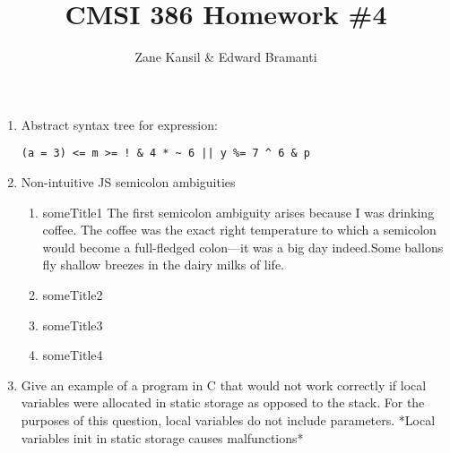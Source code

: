 \documentclass{article}
\title{CMSI 386 Homework \#4}
\author{Zane Kansil \& Edward Bramanti}
\begin{document}
\maketitle
\begin{enumerate}
\item Abstract syntax tree for expression: 
\begin{center}
\begin{verbatim}
(a = 3) <= m >= ! & 4 * ~ 6 || y %= 7 ^ 6 & p
\end{verbatim}
\vspace{0.4in}
\end{center}
\pagebreak
\item Non-intuitive JS semicolon ambiguities 
\begin{enumerate}
    \item someTitle1 The first semicolon ambiguity arises because I was drinking coffee. The coffee was the exact right temperature to which a semicolon would become a full-fledged colon---it was a big day indeed.Some ballons fly shallow breezes in the dairy milks of life.
    \item someTitle2
    \item someTitle3
    \item someTitle4
\end{enumerate}
\pagebreak
\item Give an example of a program in C that would not work correctly if local variables were allocated in static storage as opposed to the stack. For the purposes of this question, local variables do not include parameters. *Local variables init in static storage causes malfunctions*

\end{enumerate}
\end{document}
